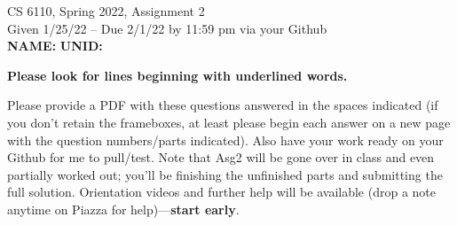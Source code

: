 \documentclass[11pt]{article}
\begin{document}



\begin{center}
\begin{large}
  CS 6110, Spring 2022, Assignment 2  \\
  Given 1/25/22 -- Due 2/1/22 by 11:59 pm via your Github 
  \ \\
    {  {\Large\bf NAME: } \hfill {\Large\bf UNID: }\hspace{4cm} }
          \ \\
\end{large}

\end{center}

 {\bf Please look for lines beginning with underlined words.}

Please provide a PDF with these questions answered
in the spaces indicated (if you don't retain the frameboxes,
at least please begin each answer on a new page
with the question numbers/parts indicated).
Also have your work ready on your Github for me to pull/test.
%
Note that Asg2 will be gone over in class and even partially
worked out; you'll be finishing the unfinished parts and submitting
the full solution.
%
Orientation videos and further help will be available (drop a note anytime
on Piazza for help)---{\bf start early}.
\end{document}
